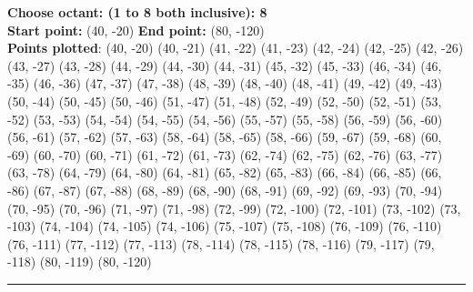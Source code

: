 \documentclass[12pt,letterpaper]{article}
\begin{document}
\textbf{Choose octant: (1 to 8 both inclusive): 8}\\
\textbf{Start point:} (40, -20)
\textbf{End point:} (80, -120)\\
\textbf{Points plotted}: 
(40, -20) (40, -21) (41, -22) (41, -23) 
(42, -24) (42, -25) (42, -26) (43, -27) 
(43, -28) (44, -29) (44, -30) (44, -31) 
(45, -32) (45, -33) (46, -34) (46, -35) 
(46, -36) (47, -37) (47, -38) (48, -39) 
(48, -40) (48, -41) (49, -42) (49, -43) 
(50, -44) (50, -45) (50, -46) (51, -47) 
(51, -48) (52, -49) (52, -50) (52, -51) 
(53, -52) (53, -53) (54, -54) (54, -55) 
(54, -56) (55, -57) (55, -58) (56, -59) 
(56, -60) (56, -61) (57, -62) (57, -63) 
(58, -64) (58, -65) (58, -66) (59, -67) 
(59, -68) (60, -69) (60, -70) (60, -71) 
(61, -72) (61, -73) (62, -74) (62, -75) 
(62, -76) (63, -77) (63, -78) (64, -79) 
(64, -80) (64, -81) (65, -82) (65, -83) 
(66, -84) (66, -85) (66, -86) (67, -87) 
(67, -88) (68, -89) (68, -90) (68, -91) 
(69, -92) (69, -93) (70, -94) (70, -95) 
(70, -96) (71, -97) (71, -98) (72, -99) 
(72, -100) (72, -101) (73, -102) (73, -103) 
(74, -104) (74, -105) (74, -106) (75, -107) 
(75, -108) (76, -109) (76, -110) (76, -111) 
(77, -112) (77, -113) (78, -114) (78, -115) 
(78, -116) (79, -117) (79, -118) (80, -119) 
(80, -120)

\hrule
\end{document}
